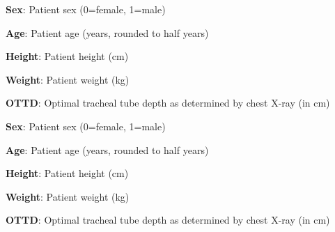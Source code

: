 \documentclass[11pt]{article}
\begin{document}
\begin{table}[h]
\caption{Descriptive Statistics of Age, Sex, Height, Weight, and OTTD}
\label{table:stat_desc_0}
\begin{threeparttable}
\renewcommand{\TPTminimum}{\linewidth}
\begin{tablenotes}
\footnotesize
\item \textbf{Sex}: Patient sex (0=female, 1=male)
\item \textbf{Age}: Patient age (years, rounded to half years)
\item \textbf{Height}: Patient height (cm)
\item \textbf{Weight}: Patient weight (kg)
\item \textbf{OTTD}: Optimal tracheal tube depth as determined by chest X-ray (in cm)
\end{tablenotes}
\end{threeparttable}
\end{table}


\begin{table}[h]
\caption{Descriptive Statistics of Age, Sex, Height, Weight, and OTTD}
\label{table:stat_desc_1}
\begin{threeparttable}
\renewcommand{\TPTminimum}{\linewidth}
\begin{tablenotes}
\footnotesize
\item \textbf{Sex}: Patient sex (0=female, 1=male)
\item \textbf{Age}: Patient age (years, rounded to half years)
\item \textbf{Height}: Patient height (cm)
\item \textbf{Weight}: Patient weight (kg)
\item \textbf{OTTD}: Optimal tracheal tube depth as determined by chest X-ray (in cm)
\end{tablenotes}
\end{threeparttable}
\end{table}
\end{document}
